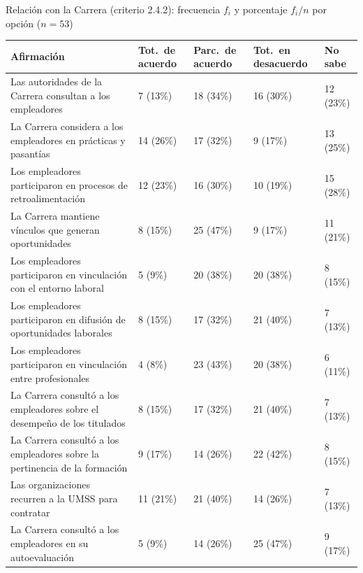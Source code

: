 \begin{mitabla}{Relación con la Carrera (criterio 2.4.2): frecuencia $f_i$ y porcentaje $f_i/n$ por opción ($n=53$)}
\begin{tabular}{L{5.6cm}C{2.0cm}C{2.0cm}C{2.1cm}C{1.5cm}}
\toprule
Afirmación & Tot.\ de acuerdo & Parc.\ de acuerdo & Tot.\ en desacuerdo & No sabe \\
\midrule
Las autoridades de la Carrera consultan a los empleadores & 7 (13\%) & 18 (34\%) & 16 (30\%) & 12 (23\%) \\
La Carrera considera a los empleadores en prácticas y pasantías & 14 (26\%) & 17 (32\%) & 9 (17\%) & 13 (25\%) \\
Los empleadores participaron en procesos de retroalimentación & 12 (23\%) & 16 (30\%) & 10 (19\%) & 15 (28\%) \\
La Carrera mantiene vínculos que generan oportunidades & 8 (15\%) & 25 (47\%) & 9 (17\%) & 11 (21\%) \\
Los empleadores participaron en vinculación con el entorno laboral & 5 (9\%) & 20 (38\%) & 20 (38\%) & 8 (15\%) \\
Los empleadores participaron en difusión de oportunidades laborales & 8 (15\%) & 17 (32\%) & 21 (40\%) & 7 (13\%) \\
Los empleadores participaron en vinculación entre profesionales & 4 (8\%) & 23 (43\%) & 20 (38\%) & 6 (11\%) \\
La Carrera consultó a los empleadores sobre el desempeño de los titulados & 8 (15\%) & 17 (32\%) & 21 (40\%) & 7 (13\%) \\
La Carrera consultó a los empleadores sobre la pertinencia de la formación & 9 (17\%) & 14 (26\%) & 22 (42\%) & 8 (15\%) \\
Las organizaciones recurren a la UMSS para contratar & 11 (21\%) & 21 (40\%) & 14 (26\%) & 7 (13\%) \\
La Carrera consultó a los empleadores en su autoevaluación & 5 (9\%) & 14 (26\%) & 25 (47\%) & 9 (17\%) \\
\bottomrule
\end{tabular}
\end{mitabla}

